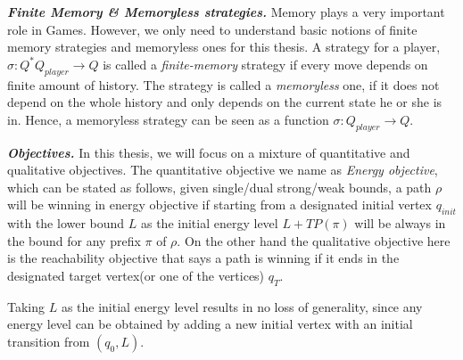 \textbf{\textit{Finite Memory \& Memoryless strategies.}} Memory plays a very important role in Games. However, we only need to understand basic notions of finite memory strategies and memoryless ones for this thesis. A strategy for a player, $\sigma : Q^{*} Q_{player} \rightarrow Q$ is called a \textit{finite-memory} strategy if every move depends on finite amount of history. The strategy is called a \textit{memoryless} one, if it does not depend on the whole history and only depends on the current state he or she is in. Hence, a memoryless strategy can be seen as a function $\sigma:Q_{player} \rightarrow Q$.
\vskip 0.6cm

\textbf{\textit{Objectives.}} In this thesis, we will focus on a mixture of quantitative and qualitative objectives. The quantitative objective we name as \textit{Energy objective}, which can be stated as follows, given single/dual strong/weak bounds, a path $\rho$ will be winning in energy objective if starting from a designated initial vertex $q_{init}$ with the lower bound $L$ as the initial energy level $L + TP(\pi)$ will be always in the bound for any prefix $\pi$ of $\rho$. On the other hand the qualitative objective here is the reachability objective that says a path is winning if it ends in the designated target vertex(or one of the vertices) $q_T$.\\
\begin{remark}
Taking $L$ as the initial energy level results in no loss of generality, since any energy level can be obtained by adding a new initial vertex with an initial transition from $(q_0,L)$.
\end{remark}
\vskip 0.6cm

